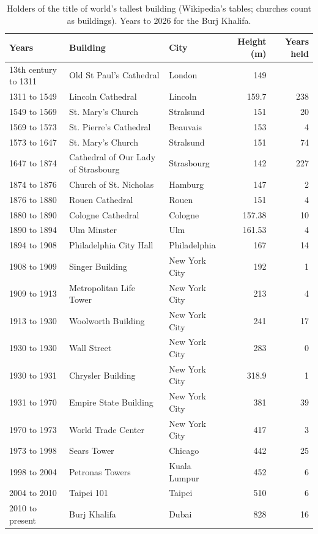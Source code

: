 \documentclass[11pt,a4paper]{article}
\begin{document}
\begin{table}[tbp]\centering\small\caption{Holders of the title of world's tallest building (Wikipedia's tables; churches count as buildings). Years to 2026 for the Burj Khalifa.}\label{tab:records}\setlength{\tabcolsep}{4pt}\begin{tabular}{l>{\raggedright\arraybackslash}p{5.2cm}>{\raggedright\arraybackslash}p{2.6cm}rr}\toprule Years & Building & City & Height (m) & Years held\\\midrule
13th century to 1311 & Old St Paul's Cathedral & London & 149 & \\
1311 to 1549 & Lincoln Cathedral & Lincoln & 159.7 & 238\\
1549 to 1569 & St. Mary's Church & Stralsund & 151 & 20\\
1569 to 1573 & St. Pierre's Cathedral & Beauvais & 153 & 4\\
1573 to 1647 & St. Mary's Church & Stralsund & 151 & 74\\
1647 to 1874 & Cathedral of Our Lady of Strasbourg & Strasbourg & 142 & 227\\
1874 to 1876 & Church of St. Nicholas & Hamburg & 147 & 2\\
1876 to 1880 & Rouen Cathedral & Rouen & 151 & 4\\
1880 to 1890 & Cologne Cathedral & Cologne & 157.38 & 10\\
1890 to 1894 & Ulm Minster & Ulm & 161.53 & 4\\
1894 to 1908 & Philadelphia City Hall & Philadelphia & 167 & 14\\
1908 to 1909 & Singer Building & New York City & 192 & 1\\
1909 to 1913 & Metropolitan Life Tower & New York City & 213 & 4\\
1913 to 1930 & Woolworth Building & New York City & 241 & 17\\
1930 to 1930 & 40 Wall Street & New York City & 283 & 0\\
1930 to 1931 & Chrysler Building & New York City & 318.9 & 1\\
1931 to 1970 & Empire State Building & New York City & 381 & 39\\
1970 to 1973 & 1 World Trade Center & New York City & 417 & 3\\
1973 to 1998 & Sears Tower & Chicago & 442 & 25\\
1998 to 2004 & Petronas Towers & Kuala Lumpur & 452 & 6\\
2004 to 2010 & Taipei 101 & Taipei & 510 & 6\\
2010 to present & Burj Khalifa & Dubai & 828 & 16\\
\bottomrule\end{tabular}\end{table}
\end{document}
